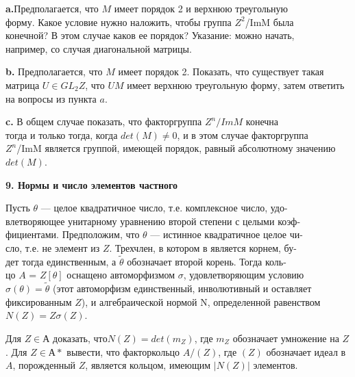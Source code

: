 \documentclass{../template/mai_book}
\begin{document}
\pagebreak

{\bf a.}Предполагается, что $M$ имеет порядок 2 и верхнюю треугольную\\ 
форму. Какое условие нужно наложить, чтобы группа $\mathit{Z}^2$/ImM была\\ конечной? В этом случае каков ее порядок? Указание: можно начать,\\ например, со случая диагональной матрицы. 

\medskip

{\bf b.} Предполагается, что $M$ имеет порядок 2. Показать, что 
существует такая матрица $U \in GL_2\mathit{Z}$, что $UM$ имеет верхнюю 
треугольную форму, затем ответить на вопросы из пункта $a$. 

\medskip

{\bf c.} В общем случае показать, что факторгруппа $\mathit{Z}^n/ImM$ конечна \\
тогда и только тогда, когда $det(M)\ne 0$, и в этом случае факторгруппа \\
$\mathit{Z}^n$/ImM является группой, имеющей порядок, равный абсолютному 
значению $det(M)$.

\medskip

{\noindent\bf 9. Нормы и число элементов частного}

\medskip

Пусть $\theta$ — целое квадратичное число, т.е. комплексное число, 
удо-\\влетворяющее унитарному уравнению второй степени с целыми 
коэф-\\фициентами. Предположим, что $\theta$ — истинное квадратичное целое 
чи-\\сло, т.е. не элемент из $\mathit{Z}$. Трехчлен, в котором в является корнем, 
бу-\\дет тогда единственным, а $\tilde{\theta}$ обозначает второй корень. Тогда 
коль-\\цо $A$ = $\mathit{Z}[\theta]$ оснащено автоморфизмом $\sigma$, удовлетворяющим условию\\ 
$\sigma(\theta) = \tilde{\theta}$ (этот автоморфизм единственный, инволютивный и оставляет\\ 
фиксированным $\mathit{Z}$), и алгебраической нормой N, определенной 
равенством $N(Z) = Z\sigma(Z)$. 


Для $Z \in А$ доказать, $что N(Z) = det(m_Z)$, где $m_Z$ обозначает 
умножение на $Z$. Для $Z \in А*$ вывести, что факторкольцо $A/(Z)$, где $(Z)$ 
обозначает идеал в $A$, порожденный $Z$, является кольцом, имеющим $|N(Z)|$ 
элементов. 
\end{document}
